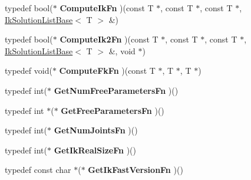 \begin{DoxyCompactItemize}
\item 
\hypertarget{classikfast_1_1IkFastFunctions_aca5c2cbe37c8b2c5702260271c343c93}{typedef bool($\ast$ {\bfseries Compute\-Ik\-Fn} )(const T $\ast$, const T $\ast$, const T $\ast$, \hyperlink{classikfast_1_1IkSolutionListBase}{Ik\-Solution\-List\-Base}$<$ T $>$ \&)}\label{classikfast_1_1IkFastFunctions_aca5c2cbe37c8b2c5702260271c343c93}

\item 
\hypertarget{classikfast_1_1IkFastFunctions_aca88e603d470204bb8e6a410cde0c9c7}{typedef bool($\ast$ {\bfseries Compute\-Ik2\-Fn} )(const T $\ast$, const T $\ast$, const T $\ast$, \hyperlink{classikfast_1_1IkSolutionListBase}{Ik\-Solution\-List\-Base}$<$ T $>$ \&, void $\ast$)}\label{classikfast_1_1IkFastFunctions_aca88e603d470204bb8e6a410cde0c9c7}

\item 
\hypertarget{classikfast_1_1IkFastFunctions_ab698a598e5939f90d8fdd2c63df2c54a}{typedef void($\ast$ {\bfseries Compute\-Fk\-Fn} )(const T $\ast$, T $\ast$, T $\ast$)}\label{classikfast_1_1IkFastFunctions_ab698a598e5939f90d8fdd2c63df2c54a}

\item 
\hypertarget{classikfast_1_1IkFastFunctions_a695aee8cc2b98f60530c9153beb73875}{typedef int($\ast$ {\bfseries Get\-Num\-Free\-Parameters\-Fn} )()}\label{classikfast_1_1IkFastFunctions_a695aee8cc2b98f60530c9153beb73875}

\item 
\hypertarget{classikfast_1_1IkFastFunctions_a57201a37ce2e50c380973d43007b3d95}{typedef int $\ast$($\ast$ {\bfseries Get\-Free\-Parameters\-Fn} )()}\label{classikfast_1_1IkFastFunctions_a57201a37ce2e50c380973d43007b3d95}

\item 
\hypertarget{classikfast_1_1IkFastFunctions_a884a76902ea19aad90175f34019a9b1e}{typedef int($\ast$ {\bfseries Get\-Num\-Joints\-Fn} )()}\label{classikfast_1_1IkFastFunctions_a884a76902ea19aad90175f34019a9b1e}

\item 
\hypertarget{classikfast_1_1IkFastFunctions_a2e8f2262c7cdf81524d750f929981739}{typedef int($\ast$ {\bfseries Get\-Ik\-Real\-Size\-Fn} )()}\label{classikfast_1_1IkFastFunctions_a2e8f2262c7cdf81524d750f929981739}

\item 
\hypertarget{classikfast_1_1IkFastFunctions_a18988dda73efc7ebb14ed4f55949613a}{typedef const char $\ast$($\ast$ {\bfseries Get\-Ik\-Fast\-Version\-Fn} )()}\label{classikfast_1_1IkFastFunctions_a18988dda73efc7ebb14ed4f55949613a}


\end{DoxyCompactItemize}
